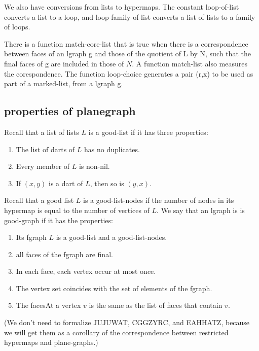 \bigskip
We also have conversions from lists to hypermaps.  The constant loop-of-list converts a list to a loop,
and loop-family-of-list converts a list of lists to a family of loops.

There is a function match-core-list that is true when there is a correspondence between
faces of an lgraph g and those of the quotient of L by N, such that the final faces of g are included in those of $N$.
A function match-list also measures the corespondence.  The function loop-choice generates a pair (r,x)
to be used as part of a marked-list, from a lgraph g.





\subsection{properties of planegraph}

\begin{definition}
Recall that a list of lists $L$ is a good-list if it has three properties:
\begin{enumerate}
\item The list of darts of $L$ has no duplicates.
\item Every member of $L$ is non-nil.
\item If $(x,y)$ is a dart of $L$, then so is $(y,x)$.
\end{enumerate}
Recall that a good list $L$ is a good-list-nodes if 
the number of nodes in its hypermap is equal to the number
of vertices of $L$.
We say that an lgraph is is good-graph if it has the properties:
\begin{enumerate}
\item Its fgraph $L$ is a good-list and a good-list-nodes.
\item all faces of the fgraph are final.
\item In each face, each vertex occur at most once.
\item The vertex set coincides with the set of elements of the fgraph.
\item The facesAt a vertex $v$ is the same as the list of faces that contain $v$.
\end{enumerate}
\end{definition}

(We don't need to formalize JUJUWAT, CGGZYRC, and EAHHATZ, because we will get them as a corollary
of the correspondence between restricted hypermaps and plane-graphs.)

